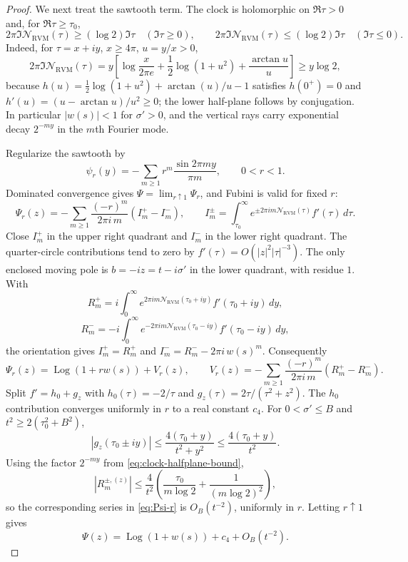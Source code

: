 \documentclass[11pt,reqno]{amsart}
\theoremstyle{definition}
\theoremstyle{remark}
\newcommand{\Log}{\operatorname{Log}}
\newcommand{\RVM}{\mathrm{RVM}}
\begin{document}
\begin{proof}
We next treat the sawtooth term.  The clock is holomorphic on $\Re\tau>0$ and, for $\Re\tau\ge\tau_0$,
\begin{equation}\label{eq:clock-halfplane-bound}
 2\pi\Im\mathcal N_{\RVM}(\tau)\ge(\log2)\Im\tau\quad(\Im\tau\ge0),
 \qquad
 2\pi\Im\mathcal N_{\RVM}(\tau)\le(\log2)\Im\tau\quad(\Im\tau\le0).
\end{equation}
Indeed, for $\tau=x+iy$, $x\ge4\pi$, $u=y/x>0$,
\[
 2\pi\Im\mathcal N_{\RVM}(\tau)
 =y\left[\log\frac{x}{2\pi e}+\frac12\log(1+u^2)+\frac{\arctan u}{u}\right]
 \ge y\log2,
\]
because $h(u)=\frac12\log(1+u^2)+\arctan(u)/u-1$ satisfies $h(0^+)=0$ and
$h'(u)=(u-\arctan u)/u^2\ge0$; the lower half-plane follows by conjugation.
In particular $|w(s)|<1$ for $\sigma'>0$, and the vertical rays carry exponential decay $2^{-my}$ in the $m$th Fourier mode.

Regularize the sawtooth by
\[
 \psi_r(y)=-\sum_{m\ge1}r^m\frac{\sin2\pi my}{\pi m},\qquad 0<r<1.
\]
Dominated convergence gives $\Psi=\lim_{r\uparrow1}\Psi_r$, and Fubini is valid for fixed $r$:
\[
 \Psi_r(z)=-\sum_{m\ge1}\frac{(-r)^m}{2\pi i\,m}(I_m^+-I_m^-),
 \qquad
 I_m^\pm=\int_{\tau_0}^\infty e^{\pm2\pi im\mathcal N_{\RVM}(\tau)}f'(\tau)\,d\tau.
\]
Close $I_m^+$ in the upper right quadrant and $I_m^-$ in the lower right quadrant.  The quarter-circle contributions tend to zero by $f'(\tau)=O(|z|^2|\tau|^{-3})$.  The only enclosed moving pole is
$b=-iz=t-i\sigma'$ in the lower quadrant, with residue $1$.  With
\[
 R_m^+=i\int_0^\infty e^{2\pi im\mathcal N_{\RVM}(\tau_0+iy)}f'(\tau_0+iy)\,dy,
\]
\[
 R_m^-=-i\int_0^\infty e^{-2\pi im\mathcal N_{\RVM}(\tau_0-iy)}f'(\tau_0-iy)\,dy,
\]
the orientation gives $I_m^+=R_m^+$ and
$I_m^-=R_m^--2\pi i\,w(s)^m$.  Consequently
\begin{equation}\label{eq:Psi-r}
 \Psi_r(z)=\Log(1+r w(s))+V_r(z),
 \qquad
 V_r(z)=-\sum_{m\ge1}\frac{(-r)^m}{2\pi i\,m}(R_m^+-R_m^-).
\end{equation}
Split $f'=h_0+g_z$ with $h_0(\tau)=-2/\tau$ and
$g_z(\tau)=2\tau/(\tau^2+z^2)$.  The $h_0$ contribution converges uniformly in $r$ to a real constant $c_4$.  For $0<\sigma'\le B$ and $t^2\ge2(\tau_0^2+B^2)$,
\[
 |g_z(\tau_0\pm iy)|\le \frac{4(\tau_0+y)}{t^2+y^2}\le\frac{4(\tau_0+y)}{t^2}.
\]
Using the factor $2^{-my}$ from \eqref{eq:clock-halfplane-bound},
\[
 |R_m^{\pm,(z)}|\le\frac4{t^2}
 \left(\frac{\tau_0}{m\log2}+\frac1{(m\log2)^2}\right),
\]
so the corresponding series in \eqref{eq:Psi-r} is $O_B(t^{-2})$, uniformly in $r$.  Letting $r\uparrow1$ gives
\begin{equation}\label{eq:Psi-asymp}
 \Psi(z)=\Log(1+w(s))+c_4+O_B(t^{-2}).
\end{equation}


\end{proof}
\end{document}
